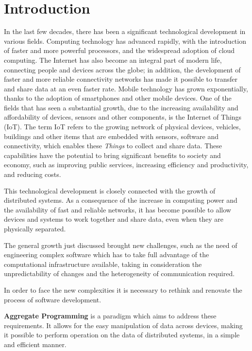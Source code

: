 \chapter{Introduction}\label{chapter:introduction}
In the last few decades, there has been a significant technological development in various fields.
Computing technology has advanced rapidly, with the introduction of faster and more powerful processors, and the widespread adoption of cloud computing.\newline
The Internet has also become an integral part of modern life, connecting people and devices across the globe; in addition, the development of faster and more reliable connectivity networks has made it possible to transfer and share data at an even faster rate.\newline
Mobile technology has grown exponentially, thanks to the adoption of smartphones and other mobile devices.\newline
One of the fields that has seen a substantial growth, due to the increasing availability and affordability of devices, sensors and other components, is the Internet of Things (IoT). The term IoT refers to the growing network of physical devices, vehicles, buildings and other items that are embedded with sensors, software and connectivity, which enables these \textit{Things} to collect and share data. These capabilities have the potential to bring significant benefits to society and economy, such as improving public services, increasing efficiency and productivity, and reducing costs.

This technological development is closely connected with the growth of distributed systems. As a consequence of the increase in computing power and the availability of fast and reliable networks, it has become possible to allow devices and systems to work together and share data, even when they are physically separated.

The general growth just discussed brought new challenges, such as the need of engineering complex software which has to take full advantage of the computational infrastructure available, taking in consideration the unpredictability of changes and the heterogeneity of communication required.

In order to face the new complexities it is necessary to rethink and renovate the process of software development.

\textbf{Aggregate Programming} is a paradigm which aims to address these requirements. It allows for the easy manipulation of data across devices, making it possible to perform operation on the data of distributed systems, in a simple and efficient manner.

